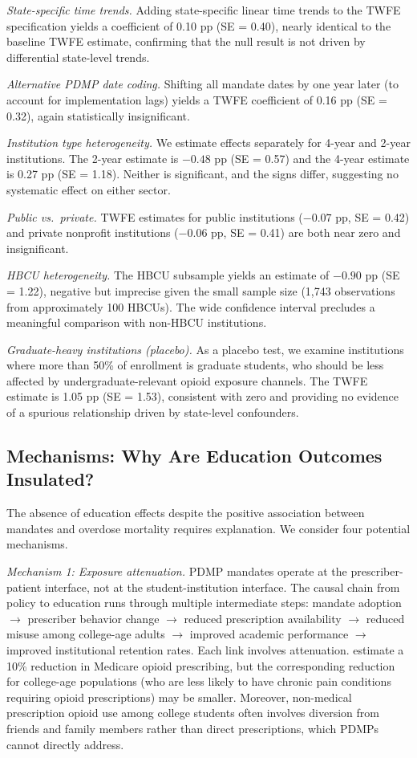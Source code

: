 \documentclass[12pt]{article}
\begin{document}
\textit{State-specific time trends.} Adding state-specific linear time trends to the TWFE specification yields a coefficient of 0.10 pp (SE = 0.40), nearly identical to the baseline TWFE estimate, confirming that the null result is not driven by differential state-level trends.

\textit{Alternative PDMP date coding.} Shifting all mandate dates by one year later (to account for implementation lags) yields a TWFE coefficient of 0.16 pp (SE = 0.32), again statistically insignificant.

\textit{Institution type heterogeneity.} We estimate effects separately for 4-year and 2-year institutions. The 2-year estimate is $-0.48$ pp (SE = 0.57) and the 4-year estimate is 0.27 pp (SE = 1.18). Neither is significant, and the signs differ, suggesting no systematic effect on either sector.

\textit{Public vs.\ private.} TWFE estimates for public institutions ($-0.07$ pp, SE = 0.42) and private nonprofit institutions ($-0.06$ pp, SE = 0.41) are both near zero and insignificant.

\textit{HBCU heterogeneity.} The HBCU subsample yields an estimate of $-0.90$ pp (SE = 1.22), negative but imprecise given the small sample size (1,743 observations from approximately 100 HBCUs). The wide confidence interval precludes a meaningful comparison with non-HBCU institutions.

\textit{Graduate-heavy institutions (placebo).} As a placebo test, we examine institutions where more than 50\% of enrollment is graduate students, who should be less affected by undergraduate-relevant opioid exposure channels. The TWFE estimate is 1.05 pp (SE = 1.53), consistent with zero and providing no evidence of a spurious relationship driven by state-level confounders.


\subsection{Mechanisms: Why Are Education Outcomes Insulated?}

The absence of education effects despite the positive association between mandates and overdose mortality requires explanation. We consider four potential mechanisms.

\textit{Mechanism 1: Exposure attenuation.} PDMP mandates operate at the prescriber-patient interface, not at the student-institution interface. The causal chain from policy to education runs through multiple intermediate steps: mandate adoption $\rightarrow$ prescriber behavior change $\rightarrow$ reduced prescription availability $\rightarrow$ reduced misuse among college-age adults $\rightarrow$ improved academic performance $\rightarrow$ improved institutional retention rates. Each link involves attenuation. \citet{buchmueller2018effect} estimate a 10\% reduction in Medicare opioid prescribing, but the corresponding reduction for college-age populations (who are less likely to have chronic pain conditions requiring opioid prescriptions) may be smaller. Moreover, non-medical prescription opioid use among college students often involves diversion from friends and family members rather than direct prescriptions, which PDMPs cannot directly address.
\end{document}
